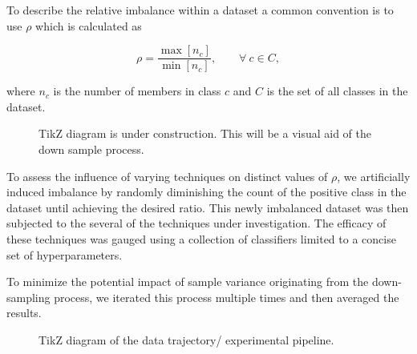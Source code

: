 \documentclass[journal]{IEEEtran}
\begin{document}
	To describe the relative imbalance within a dataset a common convention is to use $\rho$ which is calculated as

	\begin{equation}
		\rho = \frac{\max[n_c]}{\min[n_c]}, \qquad \forall\ c \in C,
	\end{equation}
	
	where $n_c$ is the number of members in class $c$ and $C$ is the set of all classes in the dataset.

\begin{figure}
	\centering
	\caption{TikZ diagram is under construction. 
		This will be a visual aid of the down sample process.}
	\label{fig:4lrff}
\end{figure}

	To assess the influence of varying techniques on distinct values of $\rho$, we artificially induced imbalance by randomly diminishing the count of the positive class in the dataset until achieving the desired ratio. This newly imbalanced dataset was then subjected to the several of the techniques under investigation. The efficacy of these techniques was gauged using a collection of classifiers limited to a concise set of hyperparameters.
	
	To minimize the potential impact of sample variance originating from the down-sampling process, we iterated this process multiple times and then averaged the results.


\begin{figure}
	\centering
	\caption{TikZ diagram of the data trajectory/ experimental pipeline.}
	\label{fig:4}
\end{figure}
\end{document}
